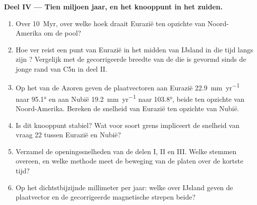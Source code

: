 \begin{problem}
\noindent\textbf{Deel IV --- Tien miljoen jaar, en het knooppunt in het zuiden.}
\begin{enumerate}[resume]
  \item Over \qty{10}{Myr}, over welke hoek draait Eurazië ten opzichte van Noord-Amerika om de pool?
  \item Hoe ver reist een punt van Eurazië in het midden van IJsland in die tijd langs zijn ? Vergelijk met de gecorrigeerde breedte van de  die is gevormd sinds de jonge rand van C5n in deel II.
  \item Op het  van de Azoren geven de plaatvectoren aan Eurazië \qty{22.9}{mm.yr^{-1}} naar \ang{95.1} en aan Nubië \qty{19.2}{mm.yr^{-1}} naar \ang{103.8}, beide ten opzichte van Noord-Amerika. Bereken de snelheid van Eurazië ten opzichte van Nubië.
  \item Is dit knooppunt stabiel? Wat voor soort grens impliceert de snelheid van vraag 22 tussen Eurazië en Nubië?
  \item Verzamel de openingssnelheden van de delen I, II en III. Welke stemmen overeen, en welke methode meet de beweging van de platen over de kortste tijd?
  \item Op het dichtstbijzijnde millimeter per jaar: welke  over IJsland geven de plaatvector en de gecorrigeerde magnetische strepen beide?
\end{enumerate}
\end{problem}
